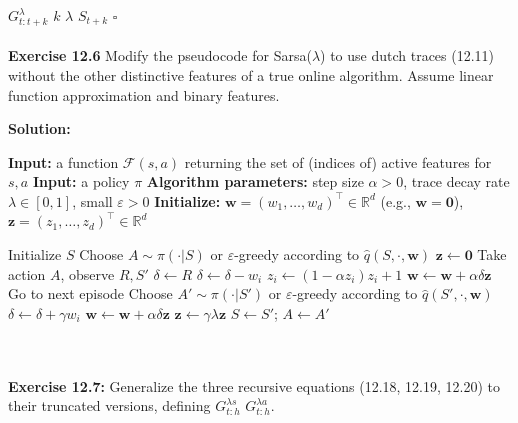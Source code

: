 \documentclass{article}
\begin{document}
 $G_{t:t+k}^\lambda$  $k$ 
$\lambda$ $S_{t+k}$ $\square$
\\\\
\textbf{Exercise 12.6} \quad Modify the pseudocode for Sarsa($\lambda$) to use dutch traces (12.11) without the other distinctive features of a true online algorithm. Assume linear function approximation and binary features.

\textbf{Solution:}
\begin{algorithm}
\caption{Sarsa($\lambda$) with Dutch traces and binary features}
\begin{algorithmic}[1]

\State \textbf{Input:} a function $\mathcal{F}(s, a)$ returning the set of (indices of) active features for $s, a$
\State \textbf{Input:} a policy $\pi$
\State \textbf{Algorithm parameters:} step size $\alpha > 0$, trace decay rate $\lambda \in [0,1]$, small $\varepsilon > 0$
\State \textbf{Initialize:} $\mathbf{w} = (w_1, \ldots, w_d)^\top \in \mathbb{R}^d$ (e.g., $\mathbf{w} = \mathbf{0}$), $\mathbf{z} = (z_1, \ldots, z_d)^\top \in \mathbb{R}^d$

    \State Initialize $S$
    \State Choose $A \sim \pi(\cdot|S)$ or $\varepsilon$-greedy according to $\hat{q}(S, \cdot, \mathbf{w})$
    \State $\mathbf{z} \leftarrow \mathbf{0}$
        \State Take action $A$, observe $R, S'$
        \State $\delta \leftarrow R$
            \State $\delta \leftarrow \delta - w_i$
            \State $z_i \leftarrow (1 - \alpha z_i) z_i + 1$ 
        \EndFor
            \State $\mathbf{w} \leftarrow \mathbf{w} + \alpha \delta \mathbf{z}$
            \State Go to next episode
        \EndIf
        \State Choose $A' \sim \pi(\cdot|S')$ or $\varepsilon$-greedy according to $\hat{q}(S', \cdot, \mathbf{w})$
            \State $\delta \leftarrow \delta + \gamma w_i$
        \EndFor
        \State $\mathbf{w} \leftarrow \mathbf{w} + \alpha \delta \mathbf{z}$
        \State $\mathbf{z} \leftarrow \gamma \lambda \mathbf{z}$
        \State $S \leftarrow S'$; $A \leftarrow A'$
    \EndFor
\EndFor

\end{algorithmic}
\end{algorithm}
\\\\
\textbf{Exercise 12.7:} Generalize the three recursive equations (12.18, 12.19, 12.20) 
to their truncated versions, defining $G_{t:h}^{\lambda s}$  $G_{t:h}^{\lambda a}$.
\\
\\
\end{document}
